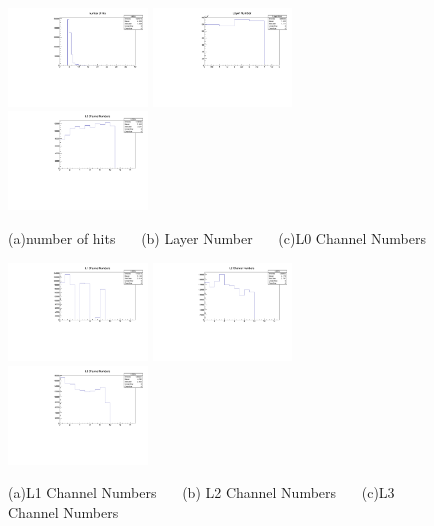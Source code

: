 \documentclass[a4paper,11pt]{article}
\theoremstyle{mytheor}
\begin{document}
\begin{figure}[H] 
\vspace*{-0.3cm} 
\includegraphics[width=0.33\textwidth,scale=0.5,trim=0 0 0 0,clip]{plotsdir/file0_muons-nHits-1.pdf} 
\includegraphics[width=0.33\textwidth,scale=0.5,trim=0 0 0 0,clip]{plotsdir/file0_muons-LayerNum-1.pdf} 
\includegraphics[width=0.33\textwidth,scale=0.5,trim=0 0 0 0,clip]{plotsdir/file0_muons-L0Ch-1.pdf} 
\caption{(a)number of hits ~~~(b) Layer Number ~~~(c)L0 Channel Numbers } 
\end{figure} 
\begin{figure}[H] 
\vspace*{-0.3cm} 
\includegraphics[width=0.33\textwidth,scale=0.5,trim=0 0 0 0,clip]{plotsdir/file0_muons-L1Ch-1.pdf} 
\includegraphics[width=0.33\textwidth,scale=0.5,trim=0 0 0 0,clip]{plotsdir/file0_muons-L2Ch-1.pdf} 
\includegraphics[width=0.33\textwidth,scale=0.5,trim=0 0 0 0,clip]{plotsdir/file0_muons-L3Ch-1.pdf} 
\caption{(a)L1 Channel Numbers ~~~(b) L2 Channel Numbers ~~~(c)L3 Channel Numbers } 
\end{figure} 
\end{document}
